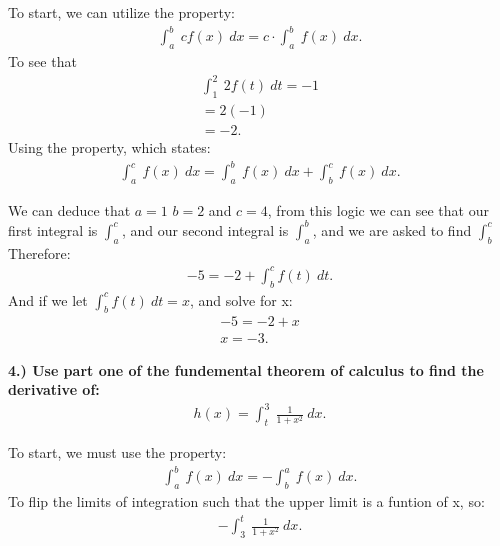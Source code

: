\documentclass{report}
\begin{document}
    \bigbreak \noindent \bigbreak \noindent
    To start, we can utilize the property:
    \begin{align*}
      \int_{a}^{b}\ cf(x)\ dx = c \cdot \int_{a}^{b}\ f(x)\ dx
    .\end{align*}
    \bigbreak \noindent \bigbreak \noindent
    To see that 
    \begin{align*}
      \int_{1}^{2}\ 2f(t)\ dt =  -1 \\
      = 2(-1) \\
      = -2
    .\end{align*}
    \bigbreak \noindent \bigbreak \noindent
    Using the property, which states:
    \begin{align*}
      \int_{a}^{c}\ f(x)\ dx = \int_{a}^{b}\ f(x)\ dx + \int_{b}^{c}\ f(x)\ dx
    .\end{align*}

    \bigbreak \noindent \bigbreak \noindent
    We can deduce that $a=1$ $b=2$ and $c=4$, from this logic we can see that our first integral is $\int_{a}^{c}$, and our second integral is $\int_{a}^{b}$, and we are asked to find $\int_{b}^{c}$
    \bigbreak \noindent \bigbreak \noindent
    Therefore:
    \begin{align*}
      -5 = -2 + \int_{b}^{c}f(t)\ dt
    .\end{align*}
    \bigbreak \noindent \bigbreak \noindent
    And if we let $\int_{b}^{c} f(t)\ dt= x$, and solve for x:
    \begin{align*}
      -5 = -2 + x \\
      \boxed{x = -3}
    .\end{align*}

    \pagebreak \bigbreak \noindent
    \begin{mdframed}
      \textbf{4.) Use part one of the fundemental theorem of calculus to find the derivative of:}
      \begin{align*}
        h(x) = \int_{t}^{3}\ \frac{1}{1+x^{2}}\ dx
      .\end{align*}
    \end{mdframed}

    \bigbreak \noindent \bigbreak \noindent
    To start, we must use the property:
    \begin{align*}
      \int_{a}^{b}\ f(x)\ dx = -\int_{b}^{a}\ f(x)\ dx
    .\end{align*}
    \bigbreak \noindent 
    To flip the limits of integration such that the upper limit is a funtion of x, so:
    \begin{align*}
      -\int_{3}^{t}\ \frac{1}{1+x^{2}}\ dx
    .\end{align*}
\end{document}
